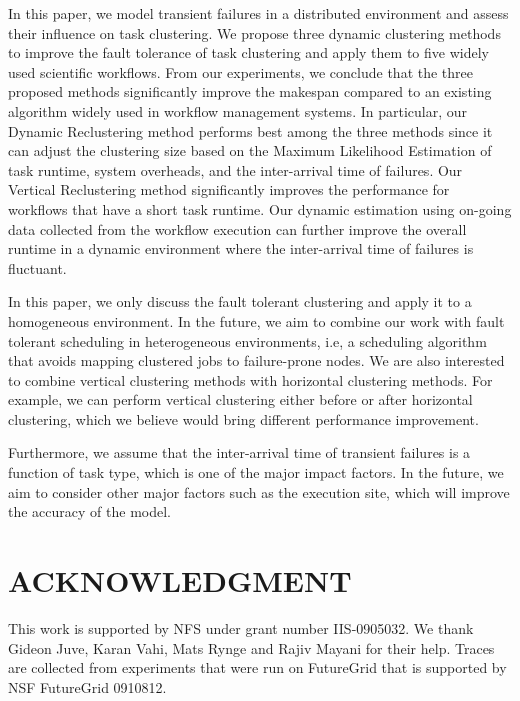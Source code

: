 \documentclass{IOS-Book-Article}
\begin{document}
In this paper, we model transient failures in a distributed environment and assess their influence on task clustering. We propose three dynamic clustering methods to improve the fault tolerance of task clustering and apply them to five widely used scientific workflows. From our experiments, we conclude that the three proposed methods significantly improve the makespan compared to an existing algorithm widely used in workflow management systems. In particular, our Dynamic Reclustering method performs best among the three methods since it can adjust the clustering size based on the Maximum Likelihood Estimation of task runtime, system overheads, and the inter-arrival time of failures. Our Vertical Reclustering method significantly improves the performance for  workflows that have a short task runtime. Our dynamic estimation using on-going data collected from the workflow execution can further improve the overall runtime in a dynamic environment where the inter-arrival time of failures is fluctuant. 

In this paper, we only discuss the fault tolerant clustering and apply it to a homogeneous environment. In the future, we aim to combine our work with fault tolerant scheduling in heterogeneous environments, i.e, a scheduling algorithm that avoids mapping clustered jobs to failure-prone nodes. We are also interested to combine vertical clustering methods with horizontal clustering methods. For example, we can perform vertical clustering either before or after horizontal clustering, which we believe would bring different performance improvement. 

Furthermore, we assume that the inter-arrival time of transient failures is a function of task type, which is one of the major impact factors. In the future, we aim to consider other major factors such as the execution site, which will improve the accuracy of the model. 

\section{ACKNOWLEDGMENT}
This work is supported by NFS under grant number IIS-0905032. We thank Gideon Juve, Karan Vahi, Mats Rynge and Rajiv Mayani for their help. Traces are collected from experiments that were run on FutureGrid that is supported by NSF FutureGrid 0910812. 





\end{document}
